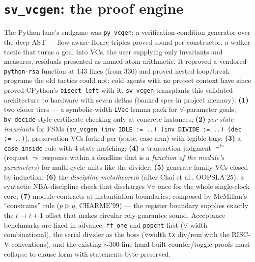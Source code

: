 \documentclass[10pt]{article}
\newcommand{\code}[1]{\texttt{#1}}
\begin{document}
\section{\texorpdfstring{\code{sv\_vcgen}}{sv\_vcgen}: the proof engine}
The Python lane's endgame was \code{py\_vcgen}: a verification-condition generator over the
deep AST --- flow-aware Hoare triples proved sound per constructor, a walker tactic that
turns a goal into VCs, the user supplying only invariants and measures, residuals presented
as named-atom arithmetic. It reproved a vendored \code{python-rsa} function at 143 lines
(from 330) and proved nested-loop/break programs the old tactics could not; cold agents
with no project context have since proved CPython's \code{bisect\_left} with it.
\code{sv\_vcgen} transplants this validated architecture to hardware with seven deltas
(banked spec in project memory): \textbf{(1)} two closer tiers --- a symbolic-width
\code{LVec} lemma pack for $\forall$-parameter goals, \code{bv\_decide}-style certificate
checking only at concrete instances; \textbf{(2)} \emph{per-state invariants} for FSMs
(\code{sv\_vcgen (inv IDLE := ..) (inv DIVIDE := ..) (dec := ..)}), preservation VCs forked
per (state, case-arm) with legible tags; \textbf{(3)} a \code{case inside} rule with
4-state matching; \textbf{(4)} a transaction judgment
$\vDash^{tx}$ (request $\leadsto$ response within a deadline that is a \emph{function of
the module's parameters}) for multi-cycle units like the divider; \textbf{(5)}
generate-family VCs closed by induction; \textbf{(6)} the \emph{discipline metatheorem}
(after Choi et al., OOPSLA'25): a syntactic NBA-discipline check that discharges
$\forall\sigma$ once for the whole single-clock core; \textbf{(7)} module contracts at
instantiation boundaries, composed by McMillan's ``constrains'' rule
($p \rhd q$, CHARME'99) --- the register boundary supplies exactly the $t\to t{+}1$ offset
that makes circular rely-guarantee sound. Acceptance benchmarks are fixed in advance:
\code{ff\_one} and \code{popcnt} first ($\forall$-width combinational), the serial divider
as the boss ($\forall$width \code{tx} div/rem with the RISC-V conventions), and the
existing $\sim$300-line hand-built counter/toggle proofs must collapse to clause form with
statements byte-preserved.
\end{document}
